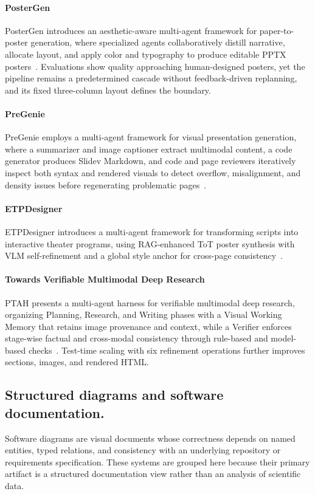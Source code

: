 \paragraph{PosterGen}
PosterGen introduces an aesthetic-aware multi-agent framework for paper-to-poster generation, where specialized agents collaboratively distill narrative, allocate layout, and apply color and typography to produce editable PPTX posters~\cite{avg250817188}. Evaluations show quality approaching human-designed posters, yet the pipeline remains a predetermined cascade without feedback-driven replanning, and its fixed three-column layout defines the boundary.

\paragraph{PreGenie}
PreGenie employs a multi-agent framework for visual presentation generation, where a summarizer and image captioner extract multimodal content, a code generator produces Slidev Markdown, and code and page reviewers iteratively inspect both syntax and rendered visuals to detect overflow, misalignment, and density issues before regenerating problematic pages~\cite{xu2025pregenie}.

\paragraph{ETPDesigner}
ETPDesigner introduces a multi-agent framework for transforming scripts into interactive theater programs, using RAG-enhanced ToT poster synthesis with VLM self-refinement and a global style anchor for cross-page consistency~\cite{avg260719947}.

\paragraph{Towards Verifiable Multimodal Deep Research}
PTAH presents a multi-agent harness for verifiable multimodal deep research, organizing Planning, Research, and Writing phases with a Visual Working Memory that retains image provenance and context, while a Verifier enforces stage-wise factual and cross-modal consistency through rule-based and model-based checks~\cite{avg260529861}. Test-time scaling with six refinement operations further improves sections, images, and rendered HTML.

\subsection{Structured diagrams and software documentation.}
Software diagrams are visual documents whose correctness depends on named entities, typed relations, and consistency with an underlying repository or requirements specification. These systems are grouped here because their primary artifact is a structured documentation view rather than an analysis of scientific data.

